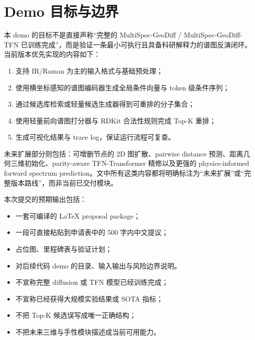\section{Demo 目标与边界}
本 demo 的目标不是直接声称“完整的 MultiSpec-GeoDiff / MultiSpec-GeoDiff-TFN 已训练完成”，而是验证一条最小可执行且具备科研解释力的谱图反演闭环。当前版本优先实现的内容如下：
\begin{enumerate}
  \item 支持 IR/Raman 为主的输入格式与基础预处理；
  \item 使用横坐标感知的谱图编码器生成全局条件向量与 token 级条件序列；
  \item 通过候选库检索或轻量候选生成器得到可重排的分子集合；
  \item 使用轻量前向谱图打分器与 RDKit 合法性规则完成 Top-K 重排；
  \item 生成可视化结果与 trace log，保证运行流程可复查。
\end{enumerate}

未来扩展部分则包括：可增删节点的 2D 图扩散、pairwise distance 预测、距离几何三维初始化、parity-aware TFN-Transformer 精修以及更强的 physics-informed forward spectrum prediction。文中所有这类内容都将明确标注为“未来扩展”或“完整版本路线”，而非当前已交付模块。

本次提交的预期输出包括：
\begin{itemize}
  \item 一套可编译的 LaTeX proposal package；
  \item 一段可直接粘贴到申请表中的 500 字内中文提议；
  \item 占位图、里程碑表与验证计划；
  \item 对后续代码 demo 的目录、输入输出与风险边界说明。
\end{itemize}

\begin{keybox}[不作出的声明]
\begin{itemize}
  \item 不宣称完整 diffusion 或 TFN 模型已经训练完成；
  \item 不宣称已经获得大规模实验结果或 SOTA 指标；
  \item 不把 Top-K 候选误写成唯一正确结构；
  \item 不把未来三维与手性模块描述成当前可用能力。
\end{itemize}
\end{keybox}
